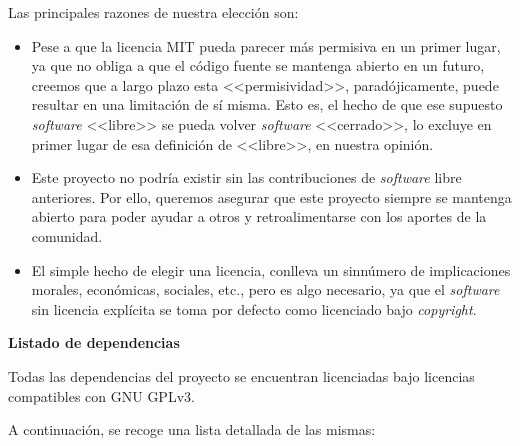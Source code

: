 Las principales razones de nuestra elección son:

\vspace{-0.3cm}
\begin{itemize}[\textbullet]
	\item Pese a que la licencia MIT pueda parecer más permisiva en un primer lugar, ya que no obliga a que el código fuente se mantenga abierto en un futuro, creemos que a largo plazo esta <<permisividad>>, paradójicamente, puede resultar en una limitación de sí misma. Esto es, el hecho de que ese supuesto \emph{software} <<libre>> se pueda volver \emph{software} <<cerrado>>, lo excluye en primer lugar de esa definición de <<libre>>, en nuestra opinión.

	\item Este proyecto no podría existir sin las contribuciones de \emph{software} libre anteriores. Por ello, queremos asegurar que este proyecto siempre se mantenga abierto para poder ayudar a otros y retroalimentarse con los aportes de la comunidad.
	
	\item El simple hecho de elegir una licencia, conlleva un sinnúmero de implicaciones morales, económicas, sociales, etc., pero es algo necesario, ya que el \emph{software} sin licencia explícita se toma por defecto como licenciado bajo \emph{copyright}.
\end{itemize}

\newpage

\noindent
\textbf{Listado de dependencias}

Todas las dependencias del proyecto se encuentran licenciadas bajo licencias compatibles con GNU GPLv3.

A continuación, se recoge una lista detallada de las mismas:


